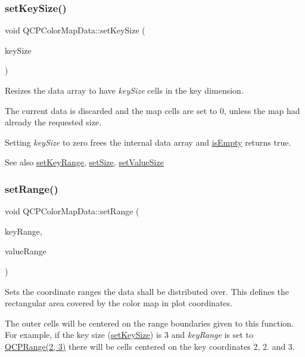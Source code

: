 \subsubsection{\texorpdfstring{set\+Key\+Size()}{setKeySize()}}
{\footnotesize\ttfamily void Q\+C\+P\+Color\+Map\+Data\+::set\+Key\+Size (\begin{DoxyParamCaption}\item[{int}]{key\+Size }\end{DoxyParamCaption})}

Resizes the data array to have {\itshape key\+Size} cells in the key dimension.

The current data is discarded and the map cells are set to 0, unless the map had already the requested size.

Setting {\itshape key\+Size} to zero frees the internal data array and \hyperlink{classQCPColorMapData_aea88cc75a76ca571acf29b2ba8ac970d}{is\+Empty} returns true.

\begin{DoxySeeAlso}{See also}
\hyperlink{classQCPColorMapData_a0738c485f3c9df9ea1241b7a8bb6a86e}{set\+Key\+Range}, \hyperlink{classQCPColorMapData_a0d9ff35c299d0478b682bfbcdd9c097e}{set\+Size}, \hyperlink{classQCPColorMapData_a0893c9e3914513048b45e3429ffd16f2}{set\+Value\+Size} 
\end{DoxySeeAlso}
\mbox{\label{classQCPColorMapData_aad9c1c7c703c1339489fc730517c83d4}} 
\subsubsection{\texorpdfstring{set\+Range()}{setRange()}}
{\footnotesize\ttfamily void Q\+C\+P\+Color\+Map\+Data\+::set\+Range (\begin{DoxyParamCaption}\item[{const \hyperlink{classQCPRange}{Q\+C\+P\+Range} \&}]{key\+Range,  }\item[{const \hyperlink{classQCPRange}{Q\+C\+P\+Range} \&}]{value\+Range }\end{DoxyParamCaption})}

Sets the coordinate ranges the data shall be distributed over. This defines the rectangular area covered by the color map in plot coordinates.

The outer cells will be centered on the range boundaries given to this function. For example, if the key size (\hyperlink{classQCPColorMapData_ac7ef70e383aface34b44dbde49234b6b}{set\+Key\+Size}) is 3 and {\itshape key\+Range} is set to {\ttfamily \hyperlink{classQCPRange}{Q\+C\+P\+Range(2, 3)}} there will be cells centered on the key coordinates 2, 2. and 3.

